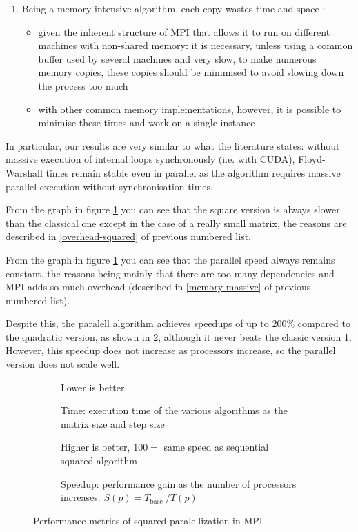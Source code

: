 \begin{enumerate}
\begin{itemize}
    \end{itemize}
    \item \label{memory-massive} Being a memory-intensive algorithm, each copy wastes time and space \cite{maras}:
    \begin{itemize}
        \item given the inherent structure of MPI that allows it to run on different machines with non-shared memory: it is necessary, unless using a common buffer used by several machines and very slow, to make numerous memory copies, these copies should be minimised to avoid slowing down the process too much
        \item with other common memory implementations, however, it is possible to minimise these times and work on a single instance
    \end{itemize}
\end{enumerate}

In particular, our results are very similar to what the literature states: without massive execution of internal loops synchronously (i.e. with CUDA), Floyd-Warshall times remain stable even in parallel as the algorithm requires massive parallel execution without synchronisation times.

From the graph in figure \cref{time} you can see that the square version is always slower than the classical one except in the case of a really small matrix, the reasons are described in \cref{overhead-squared} of previous numbered list.

From the graph in figure \cref{time} you can see that the parallel speed always remains constant, the reasons being mainly that there are too many dependencies and MPI adds so much overhead (described in \cref{memory-massive} of previous numbered list).

Despite this, the paralell algorithm achieves speedups of up to 200\% compared to the quadratic version, as shown in \cref{speedup}, although it never beats the classic version \cref{time}. However, this speedup does not increase as processors increase, so the parallel version does not scale well.

\begin{figure}[htbp]
    \datatable

    \begin{subfigure}[t]{0.5\textwidth}
                
        \caption*{Lower is better}
        \caption{Time: execution time of the various algorithms as the matrix size and step size}
        \label{time}
    \end{subfigure}
    \begin{subfigure}[t]{0.5\textwidth}
        
        \caption*{Higher is better, \(100 =\) same speed as sequential squared algorithm}
        \caption{Speedup: performance gain as the number of
        processors increases: \( S ( p ) = T _ { \text {base } } / T ( p ) \)}
        \label{speedup}
    \end{subfigure}

    \caption{Performance metrics of squared paralellization in MPI}
    \label{performance-metrics}
\end{figure}

